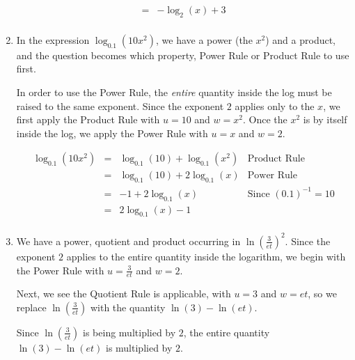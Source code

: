 \documentclass{ximera}
\begin{document}
\begin{ex}
\begin{enumerate}
\[\begin{array}{rclr}
& = & - \log_{2}(x) + 3 & \\

\end{array}\]

\setlength{\extrarowheight}{2pt}

\item   In the expression $\log_{0.1} \left(10 x^2 \right)$, we have a power (the $x^2$) and a product, and the question becomes which property, Power Rule or Product Rule to use first.

\smallskip

In order to use the Power Rule, the \textit{entire} quantity inside the log must be raised to the same exponent.  Since the exponent $2$ applies only to the $x$, we first apply the Product Rule with $u=10$ and $w=x^2$.  Once  the $x^2$ is by itself inside the log, we apply the Power Rule with $u=x$ and $w=2$.

\setlength{\extrarowheight}{6pt}
\[ \begin{array}{rclr}
\log_{0.1} \left(10 x^2 \right) & = &  \log_{0.1} (10) +  \log_{0.1} \left(x^2 \right) & \mbox{Product Rule} \\
                                & = &  \log_{0.1} (10)+ 2 \log_{0.1} (x) & \mbox{Power Rule} \\
                                & = &  -1 + 2 \log_{0.1} (x) & \mbox{Since $(0.1)^{-1} = 10$} \\
                                & = &  2 \log_{0.1} (x) - 1 & \\
                              
\end{array}\]
\setlength{\extrarowheight}{2pt}


\item  We have a power, quotient and product occurring in $\ln \left(\frac{3}{et}\right)^2$.  Since the exponent $2$ applies to the entire quantity inside the logarithm, we begin with the Power Rule with $u=\frac{3}{et}$ and $w = 2$.  

\smallskip

Next, we see the Quotient Rule is applicable, with $u=3$ and $w=et$, so we replace $\ln\left(\frac{3}{et}\right)$  with the quantity $\ln(3) - \ln(et)$. 

\smallskip

Since $\ln \left(\frac{3}{et}\right)$ is being multiplied by $2$, the entire quantity $\ln(3) - \ln(et)$ is multiplied by $2$.  

\smallskip


\end{enumerate}
\end{ex}
\end{document}
